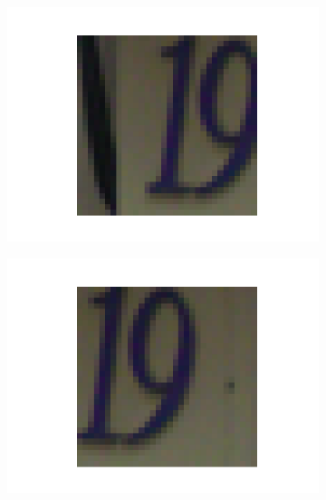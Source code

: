 \documentclass[14pt,a4paper]{extarticle}
\begin{document}
\begin{figure}[htb]
  \centering

  \begin{subfigure}[b]{0.3\textwidth}
    \includegraphics[width=\textwidth]{../res/svhn/sample_0.png}
    \label{fig:svhn_sample_0}
  \end{subfigure}
  \hfill
  \begin{subfigure}[b]{0.3\textwidth}
    \includegraphics[width=\textwidth]{../res/svhn/sample_1.png}
    \label{fig:svhn_sample_1}
  \end{subfigure}
  \hfill
  \begin{subfigure}[b]{0.3\textwidth}

\end{subfigure}
\end{figure}
\end{document}
